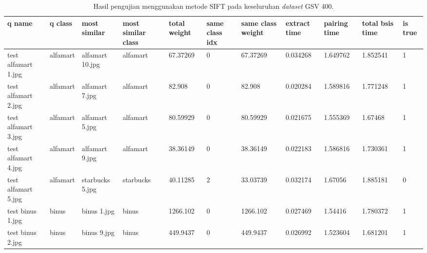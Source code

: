 \begin{landscape}
	\begin{longtable}{|p{2cm}|p{1.5cm}|p{2cm}|p{1.5cm}|p{2cm}|p{1cm}|p{2cm}|p{2cm}|p{2cm}|p{2cm}|p{1cm}|}
		\caption{Hasil pengujian menggunakan metode SIFT pada keseluruhan \textit{dataset} GSV 400.} \\
		\hline
		\textbf{q name}        & \textbf{q class} & \textbf{most similar} & \textbf{most similar class} & \textbf{total weight} & \textbf{same class idx} & \textbf{same class weight} & \textbf{extract time} & \textbf{pairing time} & \textbf{total bsis time} & \textbf{is true} \\ \hline
		test alfamart 1.jpg  & alfamart         & alfamart 10.jpg       & alfamart                    & 67.37269              & 0                       & 67.37269                   & 0.034268              & 1.649762              & 1.852541                 & 1                \\ \hline
		test alfamart 2.jpg  & alfamart         & alfamart 7.jpg        & alfamart                    & 82.908                & 0                       & 82.908                     & 0.020284              & 1.589816              & 1.771248                 & 1                \\ \hline
		test alfamart 3.jpg  & alfamart         & alfamart 5.jpg        & alfamart                    & 80.59929              & 0                       & 80.59929                   & 0.021675              & 1.555369              & 1.67468                  & 1                \\ \hline
		test alfamart 4.jpg  & alfamart         & alfamart 9.jpg        & alfamart                    & 38.36149              & 0                       & 38.36149                   & 0.022183              & 1.586816              & 1.730361                 & 1                \\ \hline
		test alfamart 5.jpg  & alfamart         & starbucks 5.jpg       & starbucks                   & 40.11285              & 2                       & 33.03739                   & 0.032174              & 1.67056               & 1.885181                 & 0                \\ \hline
		test binus 1.jpg     & binus            & binus 1.jpg           & binus                       & 1266.102              & 0                       & 1266.102                   & 0.027469              & 1.54416               & 1.780372                 & 1                \\ \hline
		test binus 2.jpg     & binus            & binus 9.jpg           & binus                       & 449.9437              & 0                       & 449.9437                   & 0.026992              & 1.523604              & 1.681201                 & 1                \\ \hline

\end{longtable}
\end{landscape}
